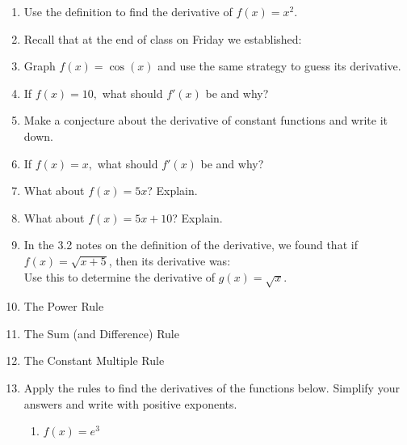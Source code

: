 \documentclass[11pt,fleqn]{article}
\begin{document}
\begin{enumerate}
\item Use the definition to find the derivative of $f(x)=x^2.$\\
\vspace{2in}
\item Recall that at the end of class on Friday we established: \\
\vspace{1in}

\item Graph $f(x)=\cos (x)$ and use the same strategy to guess its derivative.\\
\vspace{1.5in}


\item If $f(x)=10,$ what should $f'(x)$ be and why? 
\vfill

\item Make a conjecture about the derivative of constant functions and write it down. \vfill
\newpage
\item If $f(x)=x,$ what should $f'(x)$ be and why? 

\vfill
\item What about $f(x)=5x$? Explain.
\vfill
\item What about $f(x)=5x+10$? Explain.
\vfill
\item In the 3.2 notes on the definition of the derivative, we found that if $f(x) =\sqrt{x+5}$, then its derivative was: \\

Use this to determine the derivative of $g(x)=\sqrt{x}.$
\vfill
\item The Power Rule\\
\vspace{1.5in}
\item The Sum (and Difference) Rule\\
\vspace{1.5in}

\newpage
\item The Constant Multiple Rule\\
\vspace{1.5in}

\item Apply the rules to find the derivatives of the functions below. Simplify your answers and write with positive exponents.
	\begin{enumerate}
	\item $\displaystyle{f(x)=e^3}$\\
	\vfill


\end{enumerate}
\end{enumerate}
\end{document}

